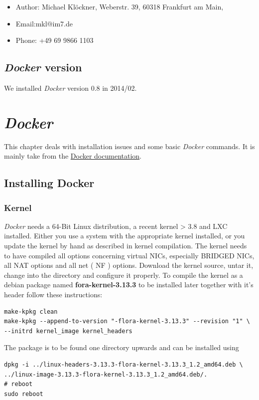 \documentclass[11pt]{article}
\begin{document}
\begin{itemize}
\item Author: Michael Klöckner, Weberstr. 39, 60318 Frankfurt am Main,
\item Email:mkl@im7.de
\item Phone: +49 69 9866 1103
\end{itemize}
\subsection{\emph{Docker} version}
\label{sec-1-4}

   We installed \emph{Docker} version 0.8 in 2014/02.
\section{\emph{Docker}}
\label{sec-2}

This chapter deals with installation issues and some basic \emph{Docker} commands. It is mainly take from the \href{http://docs.docer.io/en/latest/}{Docker documentation}. 
\subsection{Installing Docker}
\label{sec-2-1}
\subsubsection{Kernel}
\label{sec-2-1-1}

\emph{Docker} needs a 64-Bit Linux distribution, a recent kernel > 3.8 and LXC
installed. Either you use a system with the appropriate kernel installed, or
you update the kernel by hand as described in kernel compilation. The kernel needs to have compiled all options concerning virtual NICs, especially
BRIDGED NICs, all NAT options and all net  ( NF ) options. Download
the kernel source, untar it, change into the directory and configure it properly. To compile the kernel as a debian package named \textbf{fora-kernel-3.13.3}
to be installed later together with it's header follow these instructions:

\begin{verbatim}
make-kpkg clean
make-kpkg --append-to-version "-flora-kernel-3.13.3" --revision "1" \
--initrd kernel_image kernel_headers
\end{verbatim}
The package is to be found one directory upwards and can be installed using

\begin{verbatim}
dpkg -i ../linux-headers-3.13.3-flora-kernel-3.13.3_1.2_amd64.deb \
../linux-image-3.13.3-flora-kernel-3.13.3_1.2_amd64.deb/.
# reboot
sudo reboot
\end{verbatim}
\end{document}
